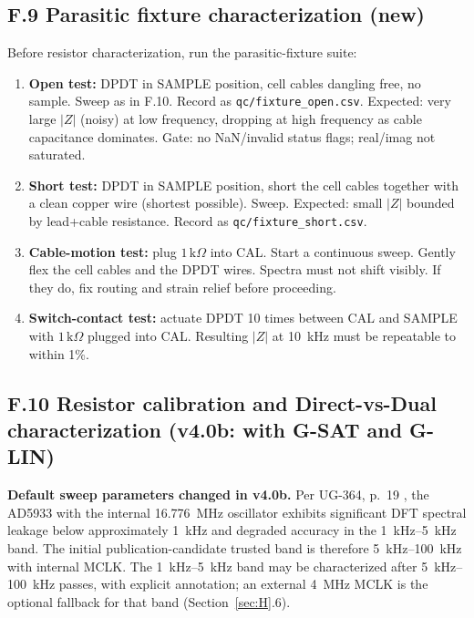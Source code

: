 \documentclass[11pt,a4paper]{article}
\newcommand{\kohm}[1]{\ensuremath{#1\,\mathrm{k}\Omega}}
\begin{document}
\subsection{F.9 Parasitic fixture characterization (new)}

\begin{gatebox}
Before resistor characterization, run the parasitic-fixture suite:
\begin{enumerate}
\item \textbf{Open test:} DPDT in SAMPLE position, cell cables dangling free, no sample. Sweep as in F.10. Record as \texttt{qc/fixture\_open.csv}. Expected: very large $|Z|$ (noisy) at low frequency, dropping at high frequency as cable capacitance dominates. Gate: no NaN/invalid status flags; real/imag not saturated.
\item \textbf{Short test:} DPDT in SAMPLE position, short the cell cables together with a clean copper wire (shortest possible). Sweep. Expected: small $|Z|$ bounded by lead+cable resistance. Record as \texttt{qc/fixture\_short.csv}.
\item \textbf{Cable-motion test:} plug \kohm{1} into CAL. Start a continuous sweep. Gently flex the cell cables and the DPDT wires. Spectra must not shift visibly. If they do, fix routing and strain relief before proceeding.
\item \textbf{Switch-contact test:} actuate DPDT 10 times between CAL and SAMPLE with \kohm{1} plugged into CAL. Resulting $|Z|$ at \SI{10}{\kilo\hertz} must be repeatable to within 1\%.
\end{enumerate}
\end{gatebox}

\subsection{F.10 Resistor calibration and Direct-vs-Dual characterization (v4.0b: with G-SAT and G-LIN)}

\textbf{Default sweep parameters changed in v4.0b.} Per UG-364, p.~19 \cite{ug364}, the AD5933 with the internal \SI{16.776}{\mega\hertz} oscillator exhibits significant DFT spectral leakage below approximately \SI{1}{\kilo\hertz} and degraded accuracy in the \SIrange{1}{5}{\kilo\hertz} band. The initial publication-candidate trusted band is therefore \SIrange{5}{100}{\kilo\hertz} with internal MCLK. The \SIrange{1}{5}{\kilo\hertz} band may be characterized after \SIrange{5}{100}{\kilo\hertz} passes, with explicit annotation; an external \SI{4}{\mega\hertz} MCLK is the optional fallback for that band (Section~\ref{sec:H}.6).
\end{document}
